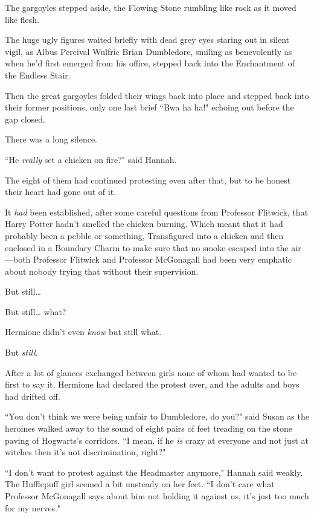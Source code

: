 The gargoyles stepped aside, the Flowing Stone rumbling like rock as it moved like flesh.

The huge ugly figures waited briefly with dead grey eyes staring out in silent vigil, as Albus Percival Wulfric Brian Dumbledore, smiling as benevolently as when he'd first emerged from his office, stepped back into the Enchantment of the Endless Stair.

Then the great gargoyles folded their wings back into place and stepped back into their former positions, only one last brief ``Bwa ha ha!" echoing out before the gap closed.

There was a long silence.

``He \emph{really} set a chicken on fire?" said Hannah.

\later

The eight of them had continued protesting even after that, but to be honest their heart had gone out of it.

It \emph{had} been established, after some careful questions from Professor Flitwick, that Harry Potter hadn't smelled the chicken burning. Which meant that it had probably been a pebble or something, Transfigured into a chicken and then enclosed in a Boundary Charm to make sure that no smoke escaped into the air---both Professor Flitwick and Professor McGonagall had been very emphatic about nobody trying that without their supervision.

But still{\ldots}

But still{\ldots} what?

Hermione didn't even \emph{know} but still what.

But \emph{still}.

After a lot of glances exchanged between girls none of whom had wanted to be first to say it, Hermione had declared the protest over, and the adults and boys had drifted off.

``You don't think we were being unfair to Dumbledore, do you?" said Susan as the heroines walked away to the sound of eight pairs of feet treading on the stone paving of Hogwarts's corridors. ``I mean, if he \emph{is} crazy at everyone and not just at witches then it's not discrimination, right?"

``I don't want to protest against the Headmaster anymore," Hannah said weakly. The Hufflepuff girl seemed a bit unsteady on her feet. ``I don't care what Professor McGonagall says about him not holding it against us, it's just too much for my nerves."

